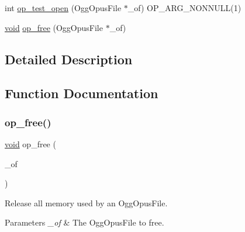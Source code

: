 \begin{DoxyCompactItemize}
\item 
int \hyperlink{group__stream__open__close_ga7b7f1c778ce6ced5538ce66e292d894d}{op\+\_\+test\+\_\+open} (Ogg\+Opus\+File $\ast$\+\_\+of) O\+P\+\_\+\+A\+R\+G\+\_\+\+N\+O\+N\+N\+U\+LL(1)
\item 
\hyperlink{png_8h_ac9c84fa68bbad002983e35ce3663c686}{void} \hyperlink{group__stream__open__close_gaf494ef9aa761647d8167c49507560d1c}{op\+\_\+free} (Ogg\+Opus\+File $\ast$\+\_\+of)
\end{DoxyCompactItemize}


\subsection{Detailed Description}


\subsection{Function Documentation}
\mbox{\label{group__stream__open__close_gaf494ef9aa761647d8167c49507560d1c}} 
\subsubsection{\texorpdfstring{op\+\_\+free()}{op\_free()}}
{\footnotesize\ttfamily \hyperlink{png_8h_ac9c84fa68bbad002983e35ce3663c686}{void} op\+\_\+free (\begin{DoxyParamCaption}\item[{Ogg\+Opus\+File $\ast$}]{\+\_\+of }\end{DoxyParamCaption})}

Release all memory used by an {\ttfamily Ogg\+Opus\+File}. 
\begin{DoxyParams}{Parameters}
{\em \+\_\+of} & The {\ttfamily Ogg\+Opus\+File} to free. \\
\hline
\end{DoxyParams}
\mbox{\label{group__stream__open__close_ga5b81c0b685f3d3c9c7d7091e5536c759}} 
